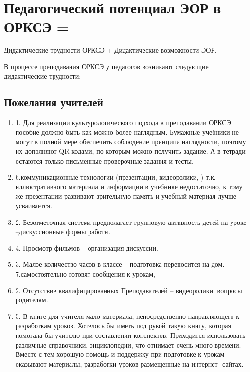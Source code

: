 \section{Педагогический потенциал ЭОР в ОРКСЭ =}
Дидактические трудности ОРКСЭ + Дидактические возможности ЭОР.
\label{section2}

В процессе преподавания ОРКСЭ у педагогов возникают следующие дидактические трудности:
\subsection{Пожелания учителей}

\begin{enumerate}
\item 1. Для реализации культурологического подхода в преподавании ОРКСЭ пособие должно быть как можно более наглядным. Бумажные учебники не могут в полной мере обеспечить соблюдение принципа наглядности, поэтому их дополняют QR кодами, по которым можно получить задание. А в тетради остаются только письменные проверочные задания и тесты.

\item 6.коммуникационные технологии (презентации, видеоролики, ) т.к. иллюстративного материала и информации в учебнике недостаточно, к тому же презентации развивают зрительную память и учебный материал лучше усваивается.

\item 2. Безотметочная система предполагает групповую активность детей на уроке --дискуссионные формы работы. 

\item 4. Просмотр фильмов -- организация дискуссии.

\item 3. Малое количество часов в классе -- подготовка переносится на дом.  7.самостоятельно готовят сообщения к урокам,

\item 2. Отсутствие квалифицированных Преподавателей -- видеоролики, вопросы  родителям.

\item 5. В книге для учителя мало материала, непосредственно направляющего к разработкам уроков. Хотелось  бы иметь под рукой такую книгу, которая помогала бы учителю при составлении конспектов. Приходится использовать различные справочники, энциклопедии, что отнимает очень много времени. Вместе с тем хорошую помощь и поддержку при подготовке к урокам оказывают материалы, разработки  уроков размещенные  на интернет- сайтах. 

\end{enumerate}

